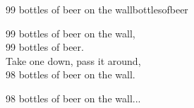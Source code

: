 \begin{song}{99 bottles of beer on the wall}{bottlesofbeer}
\begin{vers}
99 bottles of beer on the wall,\\
99 bottles of beer.\\
Take one down, pass it around, \\
98 bottles of beer on the wall.\\
\end{vers}
\begin{vers}
98 bottles of beer on the wall...\\
\end{vers}
\end{song}
